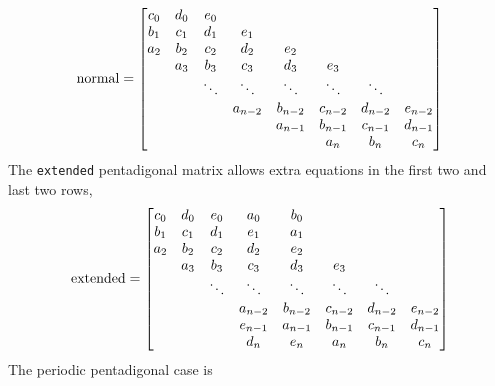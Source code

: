 \[
  {\rm normal } = 
        \begin{bmatrix}
               c_0 & d_0 & e_0  &       &        &        &        &     \\
               b_1 & c_1 & d_1  & e_1   &        &        &        &     \\
               a_2 & b_2 & c_2  & d_2   &  e_2   &        &        &     \\
                   & a_3 & b_3  & c_3   &  d_3   &  e_3   &        &     \\
                   &     &\ddots&\ddots & \ddots & \ddots & \ddots &          \\ 
                   &     &      &a_{n-2}& b_{n-2}& c_{n-2}& d_{n-2}& e_{n-2}   \\
                   &     &      &       &a_{n-1} & b_{n-1}& c_{n-1}& d_{n-1}   \\
                   &     &      &       &        &a_{n  } & b_{n  }& c_{n  }   \\
        \end{bmatrix}
\]
The {\tt extended} pentadigonal matrix allows extra equations in the first two and last two rows,
\[
  {\rm extended} = 
        \begin{bmatrix}
               c_0 & d_0 & e_0  & a_0   &  b_0   &        &        &     \\
               b_1 & c_1 & d_1  & e_1   &  a_1   &        &        &     \\
               a_2 & b_2 & c_2  & d_2   &  e_2   &        &        &     \\
                   & a_3 & b_3  & c_3   &  d_3   &  e_3   &        &     \\
                   &     &\ddots&\ddots & \ddots & \ddots & \ddots &          \\ 
                   &     &      &a_{n-2}& b_{n-2}& c_{n-2}& d_{n-2}& e_{n-2}   \\
                   &     &      &e_{n-1}&a_{n-1} & b_{n-1}& c_{n-1}& d_{n-1}   \\
                   &     &      & d_n   &e_{n  } &a_{n  } & b_{n  }& c_{n  }   \\
        \end{bmatrix}
\]
The periodic pentadigonal case is
